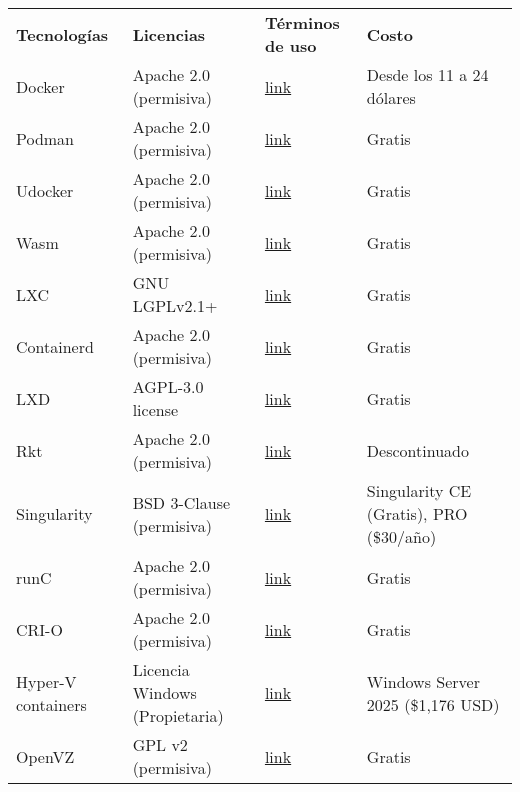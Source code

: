 \begin{table}[htbp]
\centering
{}
\begin{tabularx}{\textwidth}{>{\raggedright\arraybackslash}X 
                                  >{\raggedright\arraybackslash}X 
                                  >{\raggedright\arraybackslash}X 
                                  >{\raggedright\arraybackslash}X}
\rowcolor{gray!30}
\textbf{Tecnologías} & \textbf{Licencias} & \textbf{Términos de uso} & \textbf{Costo} \\

Docker & Apache 2.0 (permisiva) & \href{https://www.docker.com/legal/docker-terms-service/}{link} & Desde los 11 a 24 dólares \\
Podman & Apache 2.0 (permisiva) & \href{https://github.com/containers/podman/blob/main/LICENSE}{link} & Gratis \\
Udocker & Apache 2.0 (permisiva) & \href{https://github.com/indigo-dc/udocker/blob/master/LICENSE}{link} & Gratis \\
Wasm & Apache 2.0 (permisiva) & \href{https://github.com/WebAssembly/design/blob/main/LICENSE}{link} & Gratis \\
LXC & GNU LGPLv2.1+ & \href{https://linuxcontainers.org/lxc/introduction/}{link} & Gratis \\
Containerd & Apache 2.0 (permisiva) & \href{https://github.com/containerd/containerd/blob/main/LICENSE}{link} & Gratis \\
LXD & AGPL-3.0 license & \href{https://github.com/canonical/lxd}{link} & Gratis \\
Rkt & Apache 2.0 (permisiva) & \href{https://github.com/rkt/rkt/blob/master/LICENSE}{link} & Descontinuado \\
Singularity & BSD 3-Clause (permisiva) & \href{https://github.com/sylabs/singularity/blob/main/LICENSE.md}{link} & Singularity CE (Gratis), PRO (\$30/año) \\
runC & Apache 2.0 (permisiva) & \href{https://github.com/opencontainers/runc/blob/main/LICENSE}{link} & Gratis \\
CRI-O & Apache 2.0 (permisiva) & \href{https://github.com/cri-o/cri-o/blob/main/LICENSE}{link} & Gratis \\
Hyper-V containers & Licencia Windows (Propietaria) & \href{https://learn.microsoft.com/es-es/virtualization/windowscontainers/images-eula}{link} & Windows Server 2025 (\$1,176 USD) \\
OpenVZ & GPL v2 (permisiva) & \href{https://openvz.org/}{link} & Gratis \\

\end{tabularx}
\end{table}
